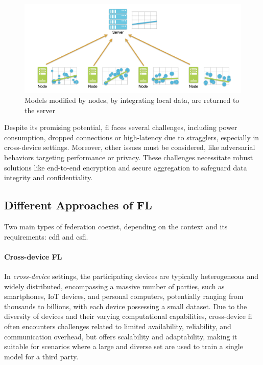 \documentclass[conference]{IEEEtran}
\begin{document}
\begin{figure}[t]
    \centering
    \vspace*{-.4cm}
    \includegraphics[width=\linewidth]{img/FL-phase2.jpg}
    \vspace*{-.8cm}
    \caption{Models modified by nodes, by integrating local data, are returned to the server}
    \label{fig:fl-phase2}
\end{figure}

Despite its promising potential, \gls{fl} faces several challenges, including power consumption, dropped connections or high-latency due to stragglers, especially in cross-device settings.
Moreover, other issues must be considered, like adversarial behaviors targeting performance or privacy.
These challenges necessitate robust solutions like end-to-end encryption and secure aggregation to safeguard data integrity and confidentiality.

\subsection{Different Approaches of FL}

Two main types of federation coexist, depending on the context and its requirements: \gls{cdfl} and \gls{csfl}.

\paragraph*{Cross-device FL} In \emph{cross-device} settings, the participating devices are typically heterogeneous and widely distributed, encompassing a massive number of parties, such as smartphones, IoT devices, and personal computers, potentially ranging from thousands to billions, with each device possessing a small dataset.
Due to the diversity of devices and their varying computational capabilities, cross-device \gls{fl} often encounters challenges related to limited availability, reliability, and communication overhead, but offers scalability and adaptability, making it suitable for scenarios where a large and diverse set are used to train a single model for a third party.
\end{document}
